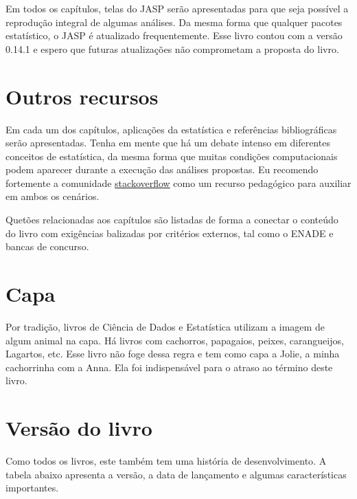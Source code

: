 \documentclass[
]{book}
\begin{document}
Em todos os capítulos, telas do JASP serão apresentadas para que seja
possível a reprodução integral de algumas análises. Da mesma forma que
qualquer pacotes estatístico, o JASP é atualizado frequentemente. Esse
livro contou com a versão 0.14.1 e espero que futuras atualizações não
comprometam a proposta do livro.

\hypertarget{outros-recursos}{%
\section{Outros recursos}\label{outros-recursos}}

Em cada um dos capítulos, aplicações da estatística e referências
bibliográficas serão apresentadas. Tenha em mente que há um debate
intenso em diferentes conceitos de estatística, da mesma forma que
muitas condições computacionais podem aparecer durante a execução das
análises propostas. Eu recomendo fortemente a comunidade
\href{https://stackoverflow.com/}{stackoverflow} como um recurso
pedagógico para auxiliar em ambos os cenários.

Quetões relacionadas aos capítulos são listadas de forma a conectar o
conteúdo do livro com exigências balizadas por critérios externos, tal
como o ENADE e bancas de concurso.

\hypertarget{capa}{%
\section{Capa}\label{capa}}

Por tradição, livros de Ciência de Dados e Estatística utilizam a imagem
de algum animal na capa. Há livros com cachorros, papagaios, peixes,
carangueijos, Lagartos, etc. Esse livro não foge dessa regra e tem como
capa a Jolie, a minha cachorrinha com a Anna. Ela foi indispensável para
o atraso ao término deste livro.

\hypertarget{versuxe3o-do-livro}{%
\section{Versão do livro}\label{versuxe3o-do-livro}}

Como todos os livros, este também tem uma história de desenvolvimento. A
tabela abaixo apresenta a versão, a data de lançamento e algumas
características importantes.
\end{document}
